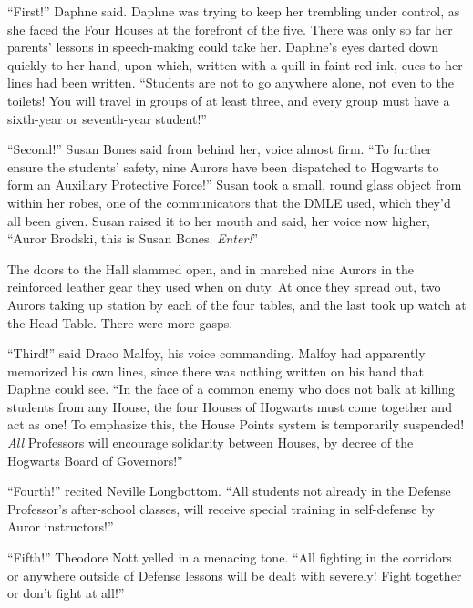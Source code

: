 ``First!'' Daphne said. Daphne was trying to keep her trembling under
control, as she faced the Four Houses at the forefront of the five.
There was only so far her parents' lessons in speech-making could take
her. Daphne's eyes darted down quickly to her hand, upon which, written
with a quill in faint red ink, cues to her lines had been written.
``Students are not to go anywhere alone, not even to the toilets! You
will travel in groups of at least three, and every group must have a
sixth-year or seventh-year student!''

``Second!'' Susan Bones said from behind her, voice almost firm. ``To
further ensure the students' safety, nine Aurors have been dispatched to
Hogwarts to form an Auxiliary Protective Force!'' Susan took a small,
round glass object from within her robes, one of the communicators that
the DMLE used, which they'd all been given. Susan raised it to her mouth
and said, her voice now higher, ``Auror Brodski, this is Susan Bones.
\emph{Enter!}''

The doors to the Hall slammed open, and in marched nine Aurors in the
reinforced leather gear they used when on duty. At once they spread out,
two Aurors taking up station by each of the four tables, and the last
took up watch at the Head Table. There were more gasps.

``Third!'' said Draco Malfoy, his voice commanding. Malfoy had
apparently memorized his own lines, since there was nothing written on
his hand that Daphne could see. ``In the face of a common enemy who does
not balk at killing students from any House, the four Houses of Hogwarts
must come together and act as one! To emphasize this, the House Points
system is temporarily suspended! \emph{All} Professors will encourage
solidarity between Houses, by decree of the Hogwarts Board of
Governors!''

``Fourth!'' recited Neville Longbottom. ``All students not already in
the Defense Professor's after-school classes, will receive special
training in self-defense by Auror instructors!''

``Fifth!'' Theodore Nott yelled in a menacing tone. ``All fighting in
the corridors or anywhere outside of Defense lessons will be dealt with
severely! Fight together or don't fight at all!''

